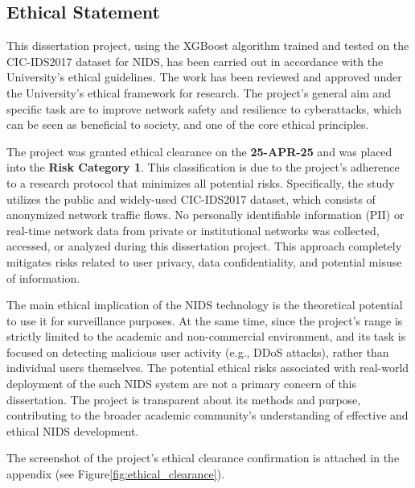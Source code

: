 \subsection{Ethical Statement}

This dissertation project, using the XGBoost algorithm trained and tested on the CIC-IDS2017 dataset for NIDS, 
has been carried out in accordance with the University's ethical guidelines. The work has been reviewed and approved under 
the University's ethical framework for research. The project's general aim and specific task are to improve network safety and 
resilience to cyberattacks, which can be seen as beneficial to society, and one of the core ethical principles.

The project was granted ethical clearance on the \textbf{25-APR-25} and was placed into the \textbf{Risk Category 1}. This 
classification is due to the project's adherence to a research protocol that minimizes all potential risks. Specifically, 
the study utilizes the public and widely-used CIC-IDS2017 dataset, which consists of anonymized network traffic flows. No
personally identifiable information (PII) or real-time network data from private or institutional networks was collected, 
accessed, or analyzed during this dissertation project. This approach completely mitigates risks related to user privacy, 
data confidentiality, and potential misuse of information.

The main ethical implication of the NIDS technology is the theoretical potential to use it for surveillance purposes. At the same 
time, since the project's range is strictly limited to the academic and non-commercial environment, and its task is focused on 
detecting malicious user activity (e.g., DDoS attacks), rather than individual users themselves. The potential ethical risks 
associated with real-world deployment of the such NIDS system are not a primary concern of this dissertation. The project is 
transparent about its methods and purpose, contributing to the broader academic community's understanding of effective and 
ethical NIDS development.

The screenshot of the project's ethical clearance confirmation is attached in the appendix (see Figure\ref{fig:ethical_clearance}).